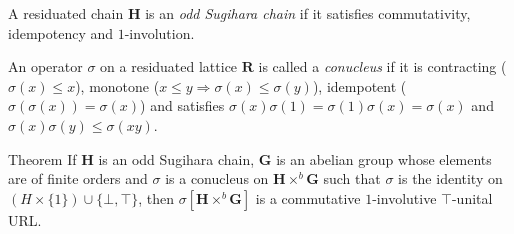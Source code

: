 \documentclass[professionalfont, handout, 12pt]{beamer} %
\theoremstyle{plain}
\theoremstyle{definition}
\newcommand{\m}[1]{{\mathbf {#1} }}
\providecommand{\implies}{\ensuremath{\Rightarrow}}
\begin{document}
\begin{frame}{}
    A residuated chain $\m H$ is an \emph{odd Sugihara chain} if it satisfies commutativity, idempotency and $1$-involution.\pause
    \medskip

    An operator $\sigma$ on a residuated lattice $\m R$ is called a \emph{conucleus} if it is contracting ($\sigma(x) \leq x$), monotone ($x \leq y \implies \sigma(x) \leq \sigma(y)$), idempotent ($\sigma(\sigma(x)) = \sigma(x)$) and satisfies $\sigma(x) \sigma(1) = \sigma(1) \sigma(x) = \sigma(x)$ and $\sigma(x) \sigma(y) \leq \sigma(xy)$.
    \pause
    \medskip

    \begin{block}{Theorem}
        If $\m H$ is an odd Sugihara chain, $\m G$ is an abelian group whose elements are of finite orders and $\sigma$ is a conucleus on $ \m H \times^b \m G$ such that $\sigma$ is the identity on $(H \times \{1\}) \cup \{\bot, \top\}$, then $\sigma[\m H \times^b \m G]$ is a commutative $1$-involutive $\top$-unital URL.
    \end{block}
\end{frame}
\end{document}
